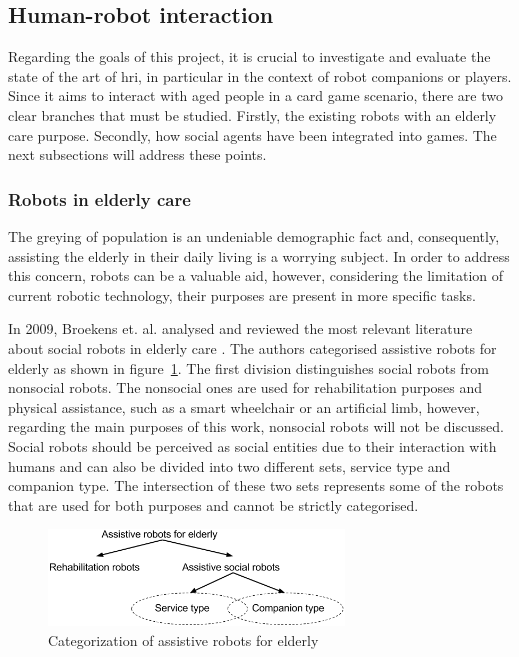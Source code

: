 \subsection{Human-robot interaction}

Regarding the goals of this project, it is crucial to investigate and evaluate the state of the art of \gls{hri}, in particular in the context of robot companions or players.
Since it aims to interact with aged people in a card game scenario, there are two clear branches that must be studied.
Firstly, the existing robots with an elderly care purpose.
Secondly, how social agents have been integrated into games.
The next subsections will address these points.



\subsubsection{Robots in elderly care}

The greying of population is an undeniable demographic fact and, consequently, assisting the elderly in their daily living is a worrying subject.
In order to address this concern, robots can be a valuable aid, however, considering the limitation of current robotic technology, their purposes are present in more specific tasks.


In 2009, Broekens et. al. analysed and reviewed the most relevant literature about social robots in elderly care \cite{Broekens2009}.
The authors categorised assistive robots for elderly as shown in figure~\ref{fig:categorization}.
The first division distinguishes social robots from nonsocial robots.
The nonsocial ones are used for rehabilitation purposes and physical assistance, such as a smart wheelchair or an artificial limb, however, regarding the main purposes of this work, nonsocial robots will not be discussed.
Social robots should be perceived as social entities due to their interaction with humans and can also be divided into two different sets, service type and companion type.
The intersection of these two sets represents some of the robots that are used for both purposes and cannot be strictly categorised.

\begin{figure}[h!]
  \centering
    \includegraphics[width=0.7\textwidth]{./img/categorization_robots}
  \caption{Categorization of assistive robots for elderly}
\label{fig:categorization}
\end{figure}

